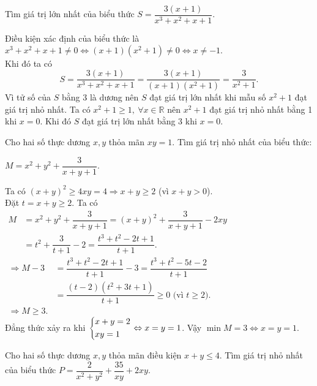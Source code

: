 \begin{bt}
	Tìm giá trị lớn nhất của biểu thức $S= \dfrac{3(x+1)}{x^3+x^2+x+1}.$
	
	\loigiai
	{
		Điều kiện xác định của biểu thức là $x^3+x^2+x+1\ne0\Leftrightarrow(x+1)(x^2+1)\ne0\Leftrightarrow x\ne-1.$\\
		Khi đó ta có $$S=\dfrac{3(x+1)}{x^3+x^2+x+1}=\dfrac{3(x+1)}{(x+1)(x^2+1)}=\dfrac{3}{x^2+1}.$$
		Vì tử số của $S$ bằng 3 là dương nên $S$ đạt giá trị lớn nhất khi mẫu số $x^2+1$ đạt giá trị nhỏ nhất. Ta có $x^2+1\geq1,\ \forall x\in\mathbb{R}$ nên $x^2+1$ đạt giá trị nhỏ nhất bằng 1 khi $x=0.$ Khi đó $S$ đạt giá trị lớn nhất bằng 3 khi $x=0.$
	}
\end{bt}

\begin{bt}
	Cho hai số thực dương $x,y$ thỏa mãn $xy = 1$. Tìm giá trị nhỏ nhất của biểu thức:
	\begin{center}
		$M=x^2+y^2+\dfrac{3}{x+y+1}$.
	\end{center}
	\loigiai
	{Ta có $(x+y)^2\geq 4xy=4\Rightarrow x+y\geq 2 $ (vì $x+y>0$).\\
		Đặt $t=x+y\geq 2$. Ta có\\
		$\begin{array}{ll}
		M& = x^2+y^2+\dfrac{3}{x+y+1}=(x+y)^2+\dfrac{3}{x+y+1}-2xy \\ 
		& =t^2+\dfrac{3}{t+1}-2=\dfrac{t^3+t^2-2t+1}{t+1}.
		\end{array}$\\
		$\begin{array}{ll}
		\Rightarrow M-3 &=\dfrac{t^3+t^2-2t+1}{t+1}-3=\dfrac{t^3+t^2-5t-2}{t+1} \\
		&=\dfrac{(t-2)(t^2+3t+1)}{t+1}\geq 0  \text{ (vì }t\geq 2\text{)}.\\
		\Rightarrow M \ge 3.
		\end{array}$\\
		Đẳng thức xảy ra khi $\left\{\begin{aligned}&x+y=2\\&xy=1\end{aligned}\right.\Leftrightarrow x=y=1 $. Vậy $\min M=3\Leftrightarrow x=y=1.$    
	}
\end{bt}

\begin{bt}%
	Cho hai số thực dương $x,y$ thỏa mãn điều kiện $x+y\leq 4$. Tìm giá trị nhỏ nhất của biểu thức $P=\dfrac{2}{x^2+y^2}+\dfrac{35}{xy}+2xy.$
\end{bt}


